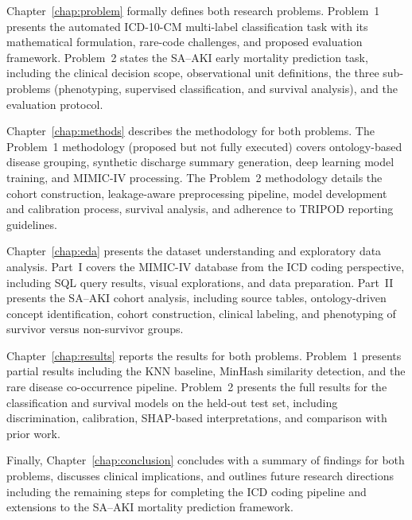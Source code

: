 Chapter~\ref{chap:problem} formally defines both research problems. Problem~1 presents the automated ICD-10-CM multi-label classification task with its mathematical formulation, rare-code challenges, and proposed evaluation framework. Problem~2 states the SA--AKI early mortality prediction task, including the clinical decision scope, observational unit definitions, the three sub-problems (phenotyping, supervised classification, and survival analysis), and the evaluation protocol.

Chapter~\ref{chap:methods} describes the methodology for both problems. The Problem~1 methodology (proposed but not fully executed) covers ontology-based disease grouping, synthetic discharge summary generation, deep learning model training, and MIMIC-IV processing. The Problem~2 methodology details the cohort construction, leakage-aware preprocessing pipeline, model development and calibration process, survival analysis, and adherence to TRIPOD reporting guidelines.

Chapter~\ref{chap:eda} presents the dataset understanding and exploratory data analysis. Part~I covers the MIMIC-IV database from the ICD coding perspective, including SQL query results, visual explorations, and data preparation. Part~II presents the SA--AKI cohort analysis, including source tables, ontology-driven concept identification, cohort construction, clinical labeling, and phenotyping of survivor versus non-survivor groups.

Chapter~\ref{chap:results} reports the results for both problems. Problem~1 presents partial results including the KNN baseline, MinHash similarity detection, and the rare disease co-occurrence pipeline. Problem~2 presents the full results for the classification and survival models on the held-out test set, including discrimination, calibration, SHAP-based interpretations, and comparison with prior work.

Finally, Chapter~\ref{chap:conclusion} concludes with a summary of findings for both problems, discusses clinical implications, and outlines future research directions including the remaining steps for completing the ICD coding pipeline and extensions to the SA--AKI mortality prediction framework.
